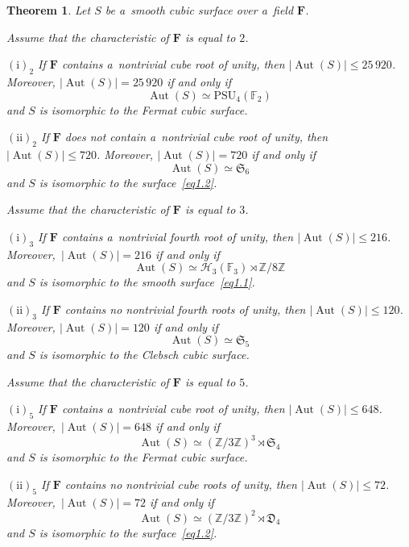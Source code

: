 \documentclass{amsart}
\numberwithin{equation}{section}
\theoremstyle{plain}
\newtheorem{theorem}{Theorem}
\theoremstyle{definition}
\theoremstyle{remark}
\begin{document}
\begin{theorem}
\label{t3}
Let $S$ be a~smooth cubic surface over a~field $\mathbf{F}$.

Assume that the characteristic of $\mathbf{F}$ is equal to $2$.

$(\mathrm{i})_2$ If\/ $\mathbf{F}$ contains a~nontrivial cube root of unity, then $|{\operatorname{Aut}(S)}| \leqslant 25\, 920$. Moreover, $|{\operatorname{Aut}(S)}| = 25\, 920$ if and only if
$$
\operatorname{Aut}(S) \simeq \mathrm{PSU}_4(\mathbb{F}_2)
$$
and $S$ is isomorphic to the Fermat cubic surface.

$(\mathrm{ii})_2$
If\/ $\mathbf{F}$ does not contain a~nontrivial cube root of unity, then
$|{\operatorname{Aut}(S)}| \leqslant 720$. Moreover, $|{\operatorname{Aut}(S)}| = 720$ if and only if
$$
\operatorname{Aut}(S) \simeq \mathfrak{S}_6
$$
and $S$ is isomorphic to the surface~\eqref{eq1.2}.

Assume that the characteristic of $\mathbf{F}$ is equal to $3$.

$(\mathrm{i})_3$  If $\mathbf{F}$ contains a~nontrivial fourth root of unity, then $|{\operatorname{Aut}(S)}| \leqslant 216$. Moreover,~\mbox{$|{\operatorname{Aut}(S)}| = 216$} if and only if
$$
\operatorname{Aut}(S) \simeq \mathcal{H}_3(\mathbb{F}_3) \rtimes \mathbb{Z}/8\mathbb{Z}
$$
and $S$ is isomorphic to the smooth surface~\eqref{eq1.1}.

$(\mathrm{ii})_3$ If\/ $\mathbf{F}$ contains no nontrivial fourth roots of unity, then $|{\operatorname{Aut}(S)}| \leqslant 120$. Moreover, $|{\operatorname{Aut}(S)}| = 120$ if and only if
$$
\operatorname{Aut}(S) \simeq \mathfrak{S}_5
$$
and $S$ is isomorphic to the Clebsch cubic surface.

Assume that the characteristic of $\mathbf{F}$ is equal to $5$.

$(\mathrm{i})_5$ If\/ $\mathbf{F}$ contains a~nontrivial cube root of unity, then $|{\operatorname{Aut}(S)}| \leqslant 648$. Moreover,~\mbox{$|{\operatorname{Aut}(S)}| = 648$} if and only if
$$
\operatorname{Aut}(S) \simeq (\mathbb{Z}/3\mathbb{Z})^3 \rtimes \mathfrak{S}_4
$$
and $S$ is isomorphic to the Fermat cubic surface.

$(\mathrm{ii})_5$  If $\mathbf{F}$ contains no nontrivial cube roots of unity, then $|{\operatorname{Aut}(S)}| \leqslant 72$. Moreover,~\mbox{$|{\operatorname{Aut}(S)}| = 72$} if and only if
$$
\operatorname{Aut}(S) \simeq (\mathbb{Z}/3\mathbb{Z})^2 \rtimes \mathfrak{D}_4
$$
and $S$ is isomorphic to the surface~\eqref{eq1.2}.


\end{theorem}
\end{document}
